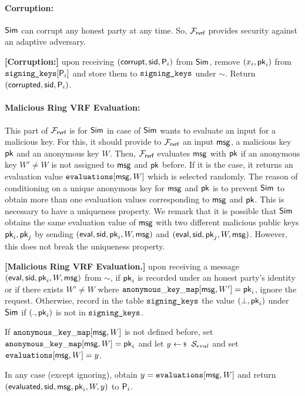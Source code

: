 \paragraph{Corruption:} $ \mathsf{Sim} $ can corrupt any honest party at any time.  So, $ \mathcal{F}_{\textsf{rvrf}} $ provides security against an adaptive adversary.

\begin{tcolorbox}[left=2pt,right=2pt]
	\textbf{[Corruption:] } 
	upon receiving $ (\mathsf{corrupt}, \textsf{sid}, \mathsf{P}_i) $ from $ \mathsf{Sim} $, remove $ (x_i,\mathsf{pk}_i) $ from $ \texttt{signing\_keys}[\mathsf{P}_i] $ and store them to $ \texttt{signing\_keys} $ under $ \sim $. Return $ (\mathsf{corrupted}, \textsf{sid},\mathsf{P}_i) $.
\end{tcolorbox}

\paragraph{Malicious Ring VRF Evaluation:} This part of $ \mathcal{F}_{\textsf{rvrf}} $ is for $ \mathsf{Sim} $ in case of $ \mathsf{Sim} $ wants to evaluate an input for a malicious key. For this,  it should provide to $ \mathcal{F}_{\textsf{rvrf}} $ an input $ \mathsf{msg} $, a malicious key $ \mathsf{pk} $ and an anonymous key $ W $.  Then, $ \mathcal{F}_{\textsf{rvrf}} $ evaluates  $ \mathsf{msg} $ with $ \mathsf{pk} $ if an anonymous key $ W' \neq W$  is not assigned to $ \mathsf{msg} $ and $ \mathsf{pk} $ before.  If it is the case, it returns an evaluation value $ \texttt{evaluations}[\mathsf{msg}, W] $ which is selected randomly. The reason of conditioning on a unique anonymous key for $ \mathsf{msg} $ and $ \mathsf{pk} $ is to prevent $ \mathsf{Sim} $ to obtain more than one evaluation values corresponding to $ \mathsf{msg} $ and $ \mathsf{pk} $. This is necessary to have a uniqueness property.
We remark that it is possible that $ \mathsf{Sim} $ obtains the same evaluation value of $ \mathsf{msg} $ with two different malicious public keys $ \mathsf{pk}_i, \mathsf{pk}_j $ by sending $ (\mathsf{eval}, \textsf{sid}, \mathsf{pk}_i, W, \mathsf{msg}) $ and $(\mathsf{eval}, \textsf{sid}, \mathsf{pk}_j, W, \mathsf{msg})$. However, this does not break the uniqueness property.

\begin{tcolorbox}[left=2pt,right=2pt]
	\textbf{[Malicious Ring VRF Evaluation.]}  upon receiving a message $(\mathsf{eval}, \textsf{sid}, \mathsf{pk}_i, W, \mathsf{msg})$ from $\sim$, if $ \mathsf{pk}_i $ is recorded under an honest party's identity or if there exists $ W'\neq W $ where $ \mathtt{anonymous\_key\_map}[\mathsf{msg},W'] = \mathsf{pk}_i $, ignore the request.
	Otherwise, record in the table $\texttt{signing\_keys}$ the value $(\perp,\mathsf{pk}_i)$ under $\mathsf{Sim}$ if $ (.,\mathsf{pk}_i) $ is not in $ \texttt{signing\_keys} $.
	
	If  $\mathtt{anonymous\_key\_map}[\mathsf{msg},W]  $ is not defined before, set $ \mathtt{anonymous\_key\_map}[\mathsf{msg},W] = \mathsf{pk}_i $ and let   $y \leftsample \setsym{S}_{eval}$ and set $ \texttt{evaluations}[\mathsf{msg}, W] = y$.
	
	In any case (except ignoring), obtain $ y = \texttt{evaluations}[\mathsf{msg}, W] $ and return $(\mathsf{evaluated}, \textsf{sid},  \mathsf{msg}, \mathsf{pk}_i,W, y)$ to $ \mathsf{P}_i $.
\end{tcolorbox}

